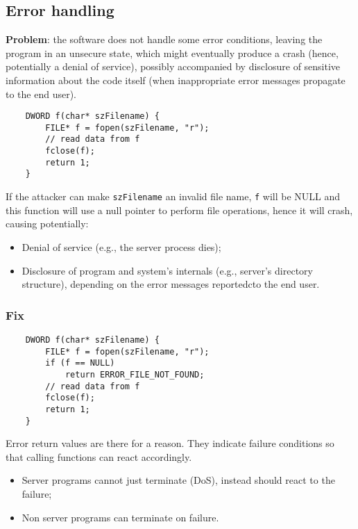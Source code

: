 \documentclass[a4paper, 10pt, titlepage]{article}
\begin{document}
\newpage
\subsection{Error handling}
\textbf{Problem}: the software does not handle some error conditions, leaving the program in an unsecure state, which might eventually produce a crash (hence, potentially a denial of service), possibly accompanied by disclosure of sensitive information about the code itself (when inappropriate error messages propagate to the end user).

\begin{lstlisting}
	DWORD f(char* szFilename) {
		FILE* f = fopen(szFilename, "r");
		// read data from f
		fclose(f);
		return 1;
	}
\end{lstlisting}
If the attacker can make \lstinline|szFilename| an invalid file name, \lstinline|f| will be NULL and this function will use a null pointer to perform file operations, hence it will crash, causing potentially:
\begin{itemize}
\item Denial of service (e.g., the server process dies);
\item Disclosure of program and system’s internals (e.g., server's directory structure), depending on the error messages reportedcto the end user.
\end{itemize}

\subsubsection*{Fix}
\begin{lstlisting}
	DWORD f(char* szFilename) {
		FILE* f = fopen(szFilename, "r");
		if (f == NULL)
			return ERROR_FILE_NOT_FOUND;
		// read data from f
		fclose(f);
		return 1;
	}
\end{lstlisting}
Error return values are there for a reason. They indicate failure
conditions so that calling functions can react accordingly.
\begin{itemize}
\item Server programs cannot just terminate (DoS), instead should react to the failure;
\item Non server programs can terminate on failure.
\end{itemize}
\end{document}
